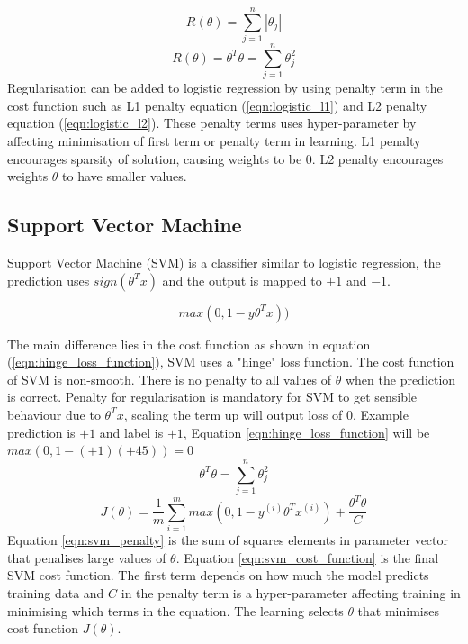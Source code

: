 \documentclass[transmag]{IEEEtran}
\begin{document}
\begin{equation}
\label{eqn:logistic_l1}
R(\theta) = \sum^n_{j=1} |\theta_j|
\end{equation}
\begin{equation}
\label{eqn:logistic_l2}
R(\theta) = \theta^T\theta = \sum^n_{j=1}\theta^2_j
\end{equation}
\noindent Regularisation can be added to logistic regression by using penalty term in the cost function such as L1 penalty equation (\ref{eqn:logistic_l1}) and L2 penalty equation (\ref{eqn:logistic_l2}). These penalty terms uses hyper-parameter by affecting minimisation of first term or penalty term in learning. L1 penalty encourages sparsity of solution, causing weights to be 0. L2 penalty encourages weights $\theta$ to have smaller values.


\subsection{Support Vector Machine}

\noindent Support Vector Machine (SVM) is a classifier similar to logistic regression, the prediction uses $sign(\theta^Tx)$ and the output is mapped to $+1$ and $-1$. 

\begin{equation}
\label{eqn:hinge_loss_function}
max(0,1-y\theta^Tx))
\end{equation}

\noindent The main difference lies in the cost function as shown in equation (\ref{eqn:hinge_loss_function}), SVM uses a "hinge" loss function. The cost function of SVM is non-smooth. There is no penalty to all values of $\theta$ when the prediction is correct. Penalty for regularisation is mandatory for SVM to get sensible behaviour due to $\theta^Tx$, scaling the term up will output loss of 0. Example prediction is $+1$ and label is $+1$, Equation \ref{eqn:hinge_loss_function} will be $max(0, 1 - (+1)(+45)) = 0$
\begin{equation}
\label{eqn:svm_penalty}
\theta^T\theta = \sum^n_{j=1} \theta^2_j
\end{equation}
\begin{equation}
\label{eqn:svm_cost_function}
J(\theta) = \frac{1}{m}\sum^m_{i=1}max(0,1-y^{(i)}\theta^Tx^{(i)})+\frac{\theta^T\theta}{C}
\end{equation}
Equation \ref{eqn:svm_penalty} is the sum of squares elements in parameter vector that penalises large values of $\theta$. Equation \ref{eqn:svm_cost_function} is the final SVM cost function. The first term depends on how much the model predicts training data and $C$ in the penalty term is a hyper-parameter affecting training in minimising which terms in the equation. The learning selects $\theta$ that minimises cost function $J(\theta)$.
\end{document}
